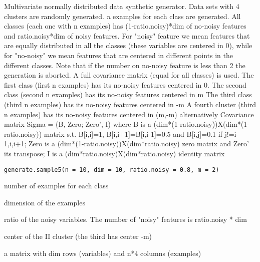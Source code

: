 \documentclass{article}
\begin{document}
\begin{Description}\relax
Multivariate normally  distributed data synthetic generator.
Data sets with 4 clusters are randomly generated.
\emph{n} examples for each class are generated.
All classes (each one with n examples) has (1-ratio.noisy)*dim of no-noisy features and ratio.noisy*dim of noisy
features. For "noisy" feature we mean features that are equally distributed in all the classes (these variables are
centered in 0), while for "no-noisy" we mean features that are  centered
in different points in the different classes. 
Note that if the number on no-noisy feature is less than 2 the generation is aborted.
A full covariance matrix (equal for all classes) is used.
The first class (first n examples) has its no-noisy features centered in 0.
The second class (second n examples) has its no-noisy features centered in m 
The third class (third n examples) has its no-noisy features centered in -m 
A fourth cluster (third n examples) has its no-noisy features centered in (m,-m) alternatively
Covariance matrix Sigma = (B, Zero; Zero', I) where B is a (dim*(1-ratio.noisy))X(dim*(1-ratio.noisy)) matrix s.t. 
B[i,i]=1, B[i,i+1]=B[i,i-1]=0.5 and
B[i,j]=0.1 if j!=i-1,i,i+1; Zero is  a (dim*(1-ratio.noisy))X(dim*ratio.noisy) zero matrix and Zero' its transpose; 
I is a (dim*ratio.noisy)X(dim*ratio.noisy) identity matrix
\end{Description}
\begin{Usage}
\begin{verbatim}
generate.sample5(n = 10, dim = 10, ratio.noisy = 0.8, m = 2)
\end{verbatim}
\end{Usage}
\begin{Arguments}
\begin{ldescription}
\item[\code{n}] number of examples for each class 
\item[\code{dim}] dimension of the examples  
\item[\code{ratio.noisy}] ratio of the noisy variables. The number of "noisy" features is  ratio.noisy * dim
\item[\code{m}] center of the II cluster (the third has center -m) 
\end{ldescription}
\end{Arguments}
\begin{Value}
a matrix with dim rows (variables) and n*4 columns (examples)
\end{Value}
\end{document}
